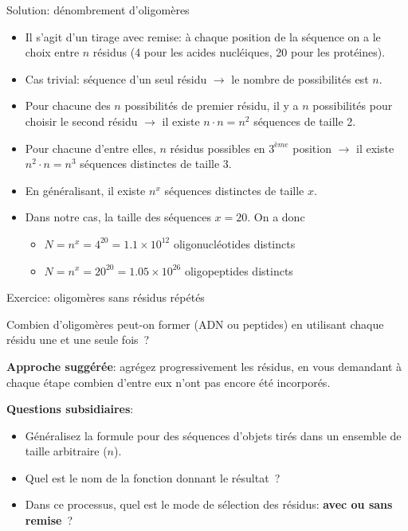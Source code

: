 \documentclass[ignorenonframetext,]{beamer}
\providecommand{\tightlist}{%
  \setlength{\itemsep}{0pt}\setlength{\parskip}{0pt}}
\begin{document}
\begin{frame}{Solution: dénombrement d'oligomères}

\begin{itemize}
\item
  Il s'agit d'un tirage avec remise: à chaque position de la séquence on
  a le choix entre \(n\) résidus (4 pour les acides nucléiques, 20 pour
  les protéines).
\item
  Cas trivial: séquence d'un seul résidu \(\rightarrow\) le nombre de
  possibilités est \(n\).
\item
  Pour chacune des \(n\) possibilités de premier résidu, il y a \(n\)
  possibilités pour choisir le second résidu \(\rightarrow\) il existe
  \(n \cdot n = n^2\) séquences de taille 2.
\item
  Pour chacune d'entre elles, \(n\) résidus possibles en \(3^{ème}\)
  position \(\rightarrow\) il existe \(n^2 \cdot n = n^3\) séquences
  distinctes de taille 3.
\item
  En généralisant, il existe \(n^x\) séquences distinctes de taille
  \(x\).
\item
  Dans notre cas, la taille des séquences \(x=20\). On a donc

  \begin{itemize}
  \tightlist
  \item
    \(N = n^x = 4^20 = 1.1\times 10^{12}\) oligonucléotides distincts
  \item
    \(N = n^x = 20^20 = 1.05\times 10^{26}\) oligopeptides distincts
  \end{itemize}
\end{itemize}

\end{frame}

\begin{frame}{Exercice: oligomères sans résidus répétés}

Combien d'oligomères peut-on former (ADN ou peptides) en utilisant
chaque résidu une et une seule fois~?

\textbf{Approche suggérée}: agrégez progressivement les résidus, en vous
demandant à chaque étape combien d'entre eux n'ont pas encore été
incorporés.

\textbf{Questions subsidiaires}:

\begin{itemize}
\tightlist
\item
  Généralisez la formule pour des séquences d'objets tirés dans un
  ensemble de taille arbitraire (\(n\)).
\item
  Quel est le nom de la fonction donnant le résultat~?
\item
  Dans ce processus, quel est le mode de sélection des résidus:
  \textbf{avec ou sans remise}~?
\end{itemize}

\end{frame}
\end{document}
